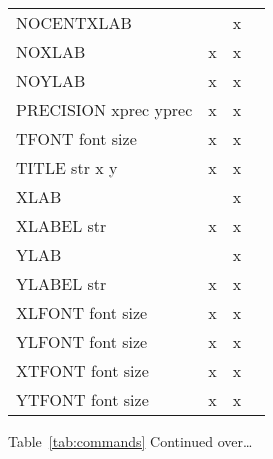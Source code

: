 \begin{center}
\begin{tabular}{lccc}
NOCENTXLAB                       &           &     x  &                    \\
NOXLAB                           &     x     &     x  &                    \\
NOYLAB                           &     x     &     x  &                    \\
PRECISION  xprec   yprec         &     x     &     x  &                    \\
TFONT  font   size               &     x     &     x  &                    \\
TITLE  str   x   y               &     x     &     x  &                    \\
XLAB                             &           &     x  &                    \\
XLABEL  str                      &     x     &     x  &                    \\
YLAB                             &           &     x  &                    \\
YLABEL  str                      &     x     &     x  &                    \\
XLFONT  font   size              &     x     &     x  &                    \\
YLFONT  font   size              &     x     &     x  &                    \\
XTFONT  font   size              &     x     &     x  &                    \\
YTFONT  font   size              &     x     &     x  &                    \\ \hline
\end{tabular}
\normalsize
\end{center}
Table~\ref{tab:commands} Continued over\ldots

